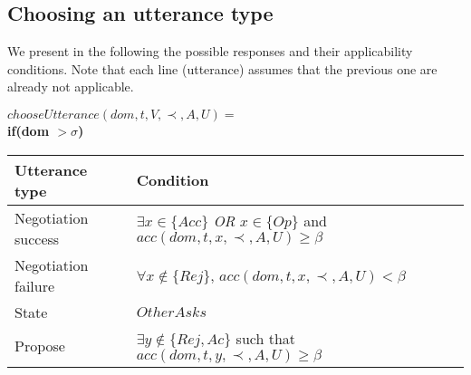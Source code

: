 \documentclass{article}
\begin{document}
	\subsection{Choosing an utterance type}
		
		We present in the following the possible responses and their applicability conditions. Note that each line (utterance)  assumes that the previous one are already not applicable.
	
	$ chooseUtterance(dom, t, V, \prec, A, U) = $ \\
	\textbf{if(\textbf{dom  $>\sigma$})} \\
	\begin{tabular}{|p{3cm}|p{9cm}|}
		\hline
		\textbf{Utterance type} & Condition \\
		\hline
	 Negotiation success &  $\exists x \in \{Acc\}$  \newline \emph{OR} \newline $x \in \{Op\}$ and \newline $acc(dom,t,x,\prec,A,U) \geq \beta$ \\
		\hline
		Negotiation failure & $ \forall x \notin \{Rej\}$, \newline  $acc(dom,t,x,\prec,A,U) < \beta $ \\
		\hline
		State & $OtherAsks$ \\
		\hline
		Propose & $\exists y \notin \{Rej, Ac\}$ such that \newline $acc(dom,t,y,\prec,A,U) \geq \beta $  \\
		
	\hline
	\end{tabular}
	\\ \\
		
\end{document}
